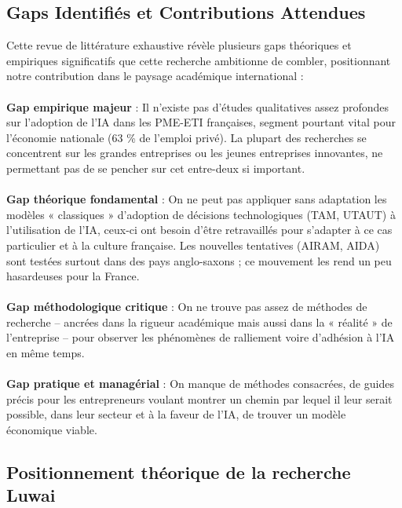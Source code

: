 \subsection{Gaps Identifiés et Contributions Attendues}

Cette revue de littérature exhaustive révèle plusieurs gaps théoriques et empiriques significatifs que cette recherche ambitionne de combler, positionnant notre contribution dans le paysage académique international :
\\\\
\textbf{Gap empirique majeur} : Il n’existe pas d’études qualitatives assez profondes sur l’adoption de l’IA dans les PME-ETI françaises, segment pourtant vital pour l’économie nationale (63 \% de l’emploi privé). La plupart des recherches se concentrent sur les grandes entreprises ou les jeunes entreprises innovantes, ne permettant pas de se pencher sur cet entre-deux si important.
\\\\
\textbf{Gap théorique fondamental} : On ne peut pas appliquer sans adaptation les modèles « classiques » d’adoption de décisions technologiques (TAM, UTAUT) à l’utilisation de l’IA, ceux-ci ont besoin d’être retravaillés pour s’adapter à ce cas particulier et à la culture française. Les nouvelles tentatives (AIRAM, AIDA) sont testées surtout dans des pays anglo-saxons ; ce mouvement les rend un peu hasardeuses pour la France.
\\\\
\textbf{Gap méthodologique critique} : On ne trouve pas assez de méthodes de recherche – ancrées dans la rigueur académique mais aussi dans la « réalité » de l’entreprise – pour observer les phénomènes de ralliement voire d’adhésion à l’IA en même temps.
\\\\
\textbf{Gap pratique et managérial} : On manque de méthodes consacrées, de guides précis pour les entrepreneurs voulant montrer un chemin par lequel il leur serait possible, dans leur secteur et à la faveur de l’IA, de trouver un modèle économique viable.

\subsection{Positionnement théorique de la recherche Luwai}

